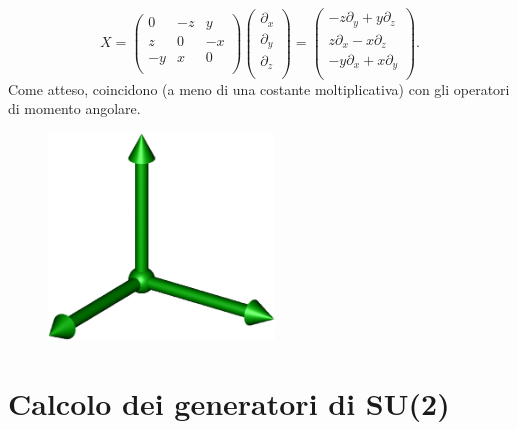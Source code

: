 \documentclass[fleqn,italian]{article}
\theoremstyle{definition}
\theoremstyle{remark}
\theoremstyle{plain}%
\theoremstyle{definition}
\theoremstyle{remark}
\numberwithin{equation}{section}
\numberwithin{thm}{section}
\begin{document}
\begin{equation}
X=\begin{pmatrix} 0 & -z & y \\ z & 0 & -x \\ -y & x & 0 \\ \end{pmatrix}
      \begin{pmatrix} \partial_x \\ \partial_y \\ \partial_z \\ \end{pmatrix}
      = \begin{pmatrix} -z\partial_y+y\partial_z \\ 
                        z\partial_x-x\partial_z \\ 
			-y\partial_x+x\partial_y \\ \end{pmatrix}.
\end{equation}
Come atteso, coincidono (a meno di una costante moltiplicativa) con gli 
operatori di momento angolare.

\begin{figure}
\begin{center}
\includegraphics[width=60mm]{axis.eps}
\end{center}
\end{figure}

\section{Calcolo dei generatori di SU(2)}
\end{document}

